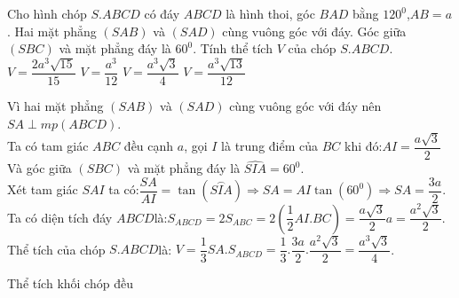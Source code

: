 \begin{ex}%
Cho hình chóp $ S.ABCD$ có đáy $ ABCD$ là hình thoi, góc $ BAD$ bằng $120^0$,$ AB=a$. Hai mặt phẳng $\left(SAB\right)$ và $\left(SAD\right)$ cùng vuông góc với đáy. Góc giữa $\left(SBC\right)$ và mặt phẳng đáy là $60^0$. Tính thể tích $ V$ của chóp $ S.ABCD$.
\choice
{$ V=\dfrac{2a^3\sqrt{15}}{15}$}
{$ V=\dfrac{a^3}{12}$}
{\True $ V=\dfrac{a^3\sqrt{3}}{4}$}
{$ V=\dfrac{a^3\sqrt{13}}{12}$}
\loigiai
{\begin{center}
\end{center}
Vì hai mặt phẳng $\left(SAB\right)$ và $\left(SAD\right)$ cùng vuông góc với đáy nên $ SA\perp mp\left(ABCD\right)$.\\
Ta có tam giác $ ABC$ đều cạnh $ a$, gọi $ I$ là trung điểm của $ BC$ khi đó:$ AI=\dfrac{a\sqrt{3}}{2}$\\
Và góc giữa $\left(SBC\right)$ và mặt phẳng đáy là $\widehat{SIA}=60^0$.\\
Xét tam giác $ SAI$ ta có:$\dfrac{SA}{AI}=\tan\left(\overset\frown{SIA}\right)\Rightarrow SA=AI\tan\left(60^0\right)\Rightarrow SA=\dfrac{3a}{2}$.\\
Ta có diện tích đáy $ ABCD$là:$S_{ABCD}=2S_{ABC}=2\left(\dfrac{1}{2}AI.BC\right)=\dfrac{a\sqrt{3}}{2}a=\dfrac{a^2\sqrt{3}}{2}$.\\
Thể tích của chóp $ S.ABCD$là: $V=\dfrac{1}{3}SA.S_{ABCD}=\dfrac{1}{3}.\dfrac{3a}{2}.\dfrac{a^2\sqrt{3}}{2}=\dfrac{a^3\sqrt{3}}{4}$.}
\end{ex}
\begin{dang}
	{Thể tích khối chóp đều }
\end{dang}


